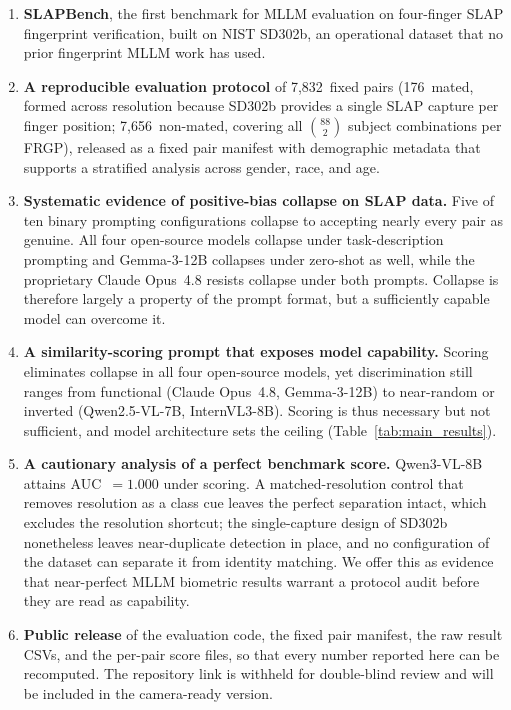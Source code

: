 \documentclass[runningheads]{llncs}
\begin{document}
\begin{enumerate}
  \item \textbf{SLAPBench}, the first benchmark for MLLM evaluation on
        four-finger SLAP fingerprint verification, built on NIST SD302b, an
        operational dataset that no prior fingerprint MLLM work has used.

  \item \textbf{A reproducible evaluation protocol} of 7,832~fixed pairs
        (176~mated, formed across resolution because SD302b provides a
        single SLAP capture per finger position; 7,656~non-mated, covering
        all $\binom{88}{2}$ subject combinations per FRGP), released as a
        fixed pair manifest with demographic metadata that supports a
        stratified analysis across gender, race, and age.

  \item \textbf{Systematic evidence of positive-bias collapse on SLAP data.}
        Five of ten binary prompting configurations collapse to accepting
        nearly every pair as genuine. All four open-source models collapse
        under task-description prompting and Gemma-3-12B collapses under
        zero-shot as well, while the proprietary Claude Opus~4.8 resists
        collapse under both prompts. Collapse is therefore largely a
        property of the prompt format, but a sufficiently capable model can
        overcome it.

  \item \textbf{A similarity-scoring prompt that exposes model capability.}
        Scoring eliminates collapse in all four open-source models, yet
        discrimination still ranges from functional (Claude Opus~4.8,
        Gemma-3-12B) to near-random or inverted (Qwen2.5-VL-7B,
        InternVL3-8B). Scoring is thus necessary but not sufficient, and
        model architecture sets the ceiling
        (Table~\ref{tab:main_results}).

  \item \textbf{A cautionary analysis of a perfect benchmark score.}
        Qwen3-VL-8B attains AUC~$= 1.000$ under scoring. A matched-resolution
        control that removes resolution as a class cue leaves the perfect
        separation intact, which excludes the resolution shortcut; the
        single-capture design of SD302b nonetheless leaves near-duplicate
        detection in place, and no configuration of the dataset can separate
        it from identity matching. We offer this as evidence that near-perfect
        MLLM biometric results warrant a protocol audit before they are read
        as capability.

  \item \textbf{Public release} of the evaluation code, the fixed pair
        manifest, the raw result CSVs, and the per-pair score files, so that
        every number reported here can be recomputed. The repository link is
        withheld for double-blind review and will be included in the
        camera-ready version.
\end{enumerate}
\end{document}
